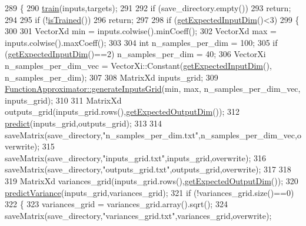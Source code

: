 \begin{DoxyCode}
289 \{
290   \hyperlink{classDmpBbo_1_1FunctionApproximator_a9781476c7d296da4aaf50e74cd273a75}{train}(inputs,targets);
291   
292   \textcolor{keywordflow}{if} (save\_directory.empty())
293     \textcolor{keywordflow}{return};
294   
295   \textcolor{keywordflow}{if} (!\hyperlink{classDmpBbo_1_1FunctionApproximator_a178135f623d9b9058870851a53299c6e}{isTrained}())
296     \textcolor{keywordflow}{return};
297   
298   \textcolor{keywordflow}{if} (\hyperlink{classDmpBbo_1_1FunctionApproximator_af5a550bcf65d5a29a153a594cc4e3fa1}{getExpectedInputDim}()<3)
299   \{
300     
301     VectorXd min = inputs.colwise().minCoeff();
302     VectorXd max = inputs.colwise().maxCoeff();
303     
304     \textcolor{keywordtype}{int} n\_samples\_per\_dim = 100;
305     \textcolor{keywordflow}{if} (\hyperlink{classDmpBbo_1_1FunctionApproximator_af5a550bcf65d5a29a153a594cc4e3fa1}{getExpectedInputDim}()==2) n\_samples\_per\_dim = 40;
306     VectorXi n\_samples\_per\_dim\_vec = VectorXi::Constant(\hyperlink{classDmpBbo_1_1FunctionApproximator_af5a550bcf65d5a29a153a594cc4e3fa1}{getExpectedInputDim}(),
      n\_samples\_per\_dim);
307 
308     MatrixXd inputs\_grid;
309     \hyperlink{classDmpBbo_1_1FunctionApproximator_a61da4383ffab7d919c98d628c1d217d1}{FunctionApproximator::generateInputsGrid}(min, max, 
      n\_samples\_per\_dim\_vec, inputs\_grid);
310     
311     MatrixXd outputs\_grid(inputs\_grid.rows(),\hyperlink{classDmpBbo_1_1FunctionApproximator_a6ad3f18b3d0ebb913a6a914be60b77e1}{getExpectedOutputDim}());
312     \hyperlink{classDmpBbo_1_1FunctionApproximator_a0547681a81d4c43ce2601f16047baf7a}{predict}(inputs\_grid,outputs\_grid);
313     
314     saveMatrix(save\_directory,\textcolor{stringliteral}{"n\_samples\_per\_dim.txt"},n\_samples\_per\_dim\_vec,overwrite);
315     saveMatrix(save\_directory,\textcolor{stringliteral}{"inputs\_grid.txt"},inputs\_grid,overwrite);
316     saveMatrix(save\_directory,\textcolor{stringliteral}{"outputs\_grid.txt"},outputs\_grid,overwrite);
317 
318 
319     MatrixXd variances\_grid(inputs\_grid.rows(),\hyperlink{classDmpBbo_1_1FunctionApproximator_a6ad3f18b3d0ebb913a6a914be60b77e1}{getExpectedOutputDim}());
320     \hyperlink{classDmpBbo_1_1FunctionApproximator_ae7931f49eb4d095e1c007edcbad58684}{predictVariance}(inputs\_grid,variances\_grid);
321     \textcolor{keywordflow}{if} (!variances\_grid.size()==0)
322     \{
323       variances\_grid = variances\_grid.array().sqrt();
324       saveMatrix(save\_directory,\textcolor{stringliteral}{"variances\_grid.txt"},variances\_grid,overwrite);

\end{DoxyCode}
